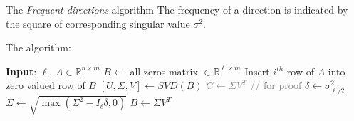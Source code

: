 \documentclass[first=dgreen,second=purple,logo=redque]{aaltoslides}
\begin{document}
\begin{frame}[allowframebreaks=1]{The \textit{Frequent-directions} algorithm}
The frequency of a direction is indicated by the square of corresponding singular value $\sigma^2$.

\framebreak
The algorithm:
  \begin{algorithmic}
    \State \textbf{Input}: $\ell$, $A \in \mathbb{R}^{n\times m}$
    \State $B \leftarrow $ all zeros matrix $\in \mathbb{R}^{\ell\times m}$
    \State Insert $i^{th}$ row of $A$ into zero valued row of $B$
      \State $[U,\Sigma,V] \leftarrow SVD(B)$
      \textcolor{gray}{\State $C \leftarrow \Sigma V^T$ // for proof}
      \State $\delta \leftarrow \sigma_{\ell/2}^2$
      \State $\breve{\Sigma} \leftarrow \sqrt{\max(\Sigma^2-I_\ell\delta,0)}$
      \State $B\leftarrow \breve{\Sigma}V^T$
    \EndIf
    \EndFor
  \end{algorithmic}
\end{frame}
\end{document}
